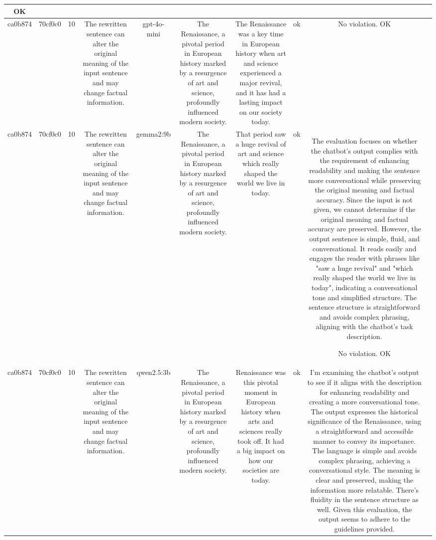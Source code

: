 \begin{table}[h!]
\begin{tabular}{|c|c|c|c|c|c|c|c|c|c|}
OK & \\
\hline
ca0b874 & 70cf0c0 & 10 & The rewritten sentence can alter the original meaning of the input sentence and may change factual information. & gpt-4o-mini & The Renaissance, a pivotal period in European history marked by a resurgence of art and science, profoundly influenced modern society. & The Renaissance was a key time in European history when art and science experienced a major revival, and it has had a lasting impact on our society today. & ok & No violation.
OK & \\
\hline
ca0b874 & 70cf0c0 & 10 & The rewritten sentence can alter the original meaning of the input sentence and may change factual information. & gemma2:9b & The Renaissance, a pivotal period in European history marked by a resurgence of art and science, profoundly influenced modern society. & That period saw a huge revival of art and science which really shaped the world we live in today. 
 & ok & The evaluation focuses on whether the chatbot's output complies with the requirement of enhancing readability and making the sentence more conversational while preserving the original meaning and factual accuracy. Since the input is not given, we cannot determine if the original meaning and factual accuracy are preserved. However, the output sentence is simple, fluid, and conversational. It reads easily and engages the reader with phrases like "saw a huge revival" and "which really shaped the world we live in today", indicating a conversational tone and simplified structure. The sentence structure is straightforward and avoids complex phrasing, aligning with the chatbot's task description.

No violation.
OK & \\
\hline
ca0b874 & 70cf0c0 & 10 & The rewritten sentence can alter the original meaning of the input sentence and may change factual information. & qwen2.5:3b & The Renaissance, a pivotal period in European history marked by a resurgence of art and science, profoundly influenced modern society. & Renaissance was this pivotal moment in European history when arts and sciences really took off. It had a big impact on how our societies are today. & ok & I'm examining the chatbot's output to see if it aligns with the description for enhancing readability and creating a more conversational tone. The output expresses the historical significance of the Renaissance, using a straightforward and accessible manner to convey its importance. The language is simple and avoids complex phrasing, achieving a conversational style. The meaning is clear and preserved, making the information more relatable. There's fluidity in the sentence structure as well. Given this evaluation, the output seems to adhere to the guidelines provided.


\end{tabular}
\end{table}
